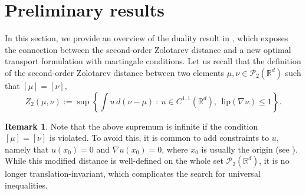 \documentclass[11pt,reqno]{amsart}
\theoremstyle{definition}
\newtheorem{remark}[theorem]{Remark}
\numberwithin{equation}{section}
\newcommand{\R}{\mathbb{R}}
\newcommand{\Rd}{{\R^d}}
\newcommand{\Mes}{{\mathcal{M}}}
\newcommand{\dive}{{\mathrm{div}}}
\newcommand{\PP}{\mathcal{P}}
\newcommand{\pairing}[1]{{\left \langle #1 \right \rangle}}
\newcommand{\Lip}{{\mathrm{lip}}}
\newcommand{\D}{\mathcal{D}}
\newcommand{\Sdd}{{\mathcal{S}^{d \times d}}}
\begin{document}
\begin{itemize}[leftmargin=1.2\parindent]
%
%
\end{itemize}
	







\section{Preliminary results}

In this section, we provide an overview of the duality result in \cite{bolbou2024}, which exposes the connection between the second-order Zolotarev distance and a new optimal transport formulation with martingale conditions.
Let us recall that the definition of the second-order Zolotarev distance between two elements  $\mu,\nu \in \mathcal{P}_2(\Rd)$ such that $[\mu] = [\nu]$,
\begin{equation}
\label{Zolotarev}
Z_2(\mu,\nu):= \sup\left\{  \int u \, d(\nu-\mu) \ :\  u\in C^{1,1}(\R^d),\ \  \Lip(\nabla u)\le 1\right\}.
\end{equation}

\begin{remark}
\label{finiteZ}
Note that the above supremum is infinite if the condition  $[\mu] = [\nu]$ is violated.  To avoid this, it is common to add constraints to $u$, namely
that $u(x_0)=0$ and $\nabla u(x_0)=0$,  where $x_0$ is usually the origin (see \cite{belili2000}). While this modified distance is well-defined on the whole set $\PP_2(\R^d)$, it is no longer translation-invariant, which complicates the search for universal inequalities.
\end{remark}
\end{document}
